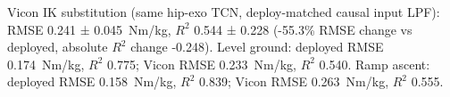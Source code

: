Vicon IK substitution (same hip-exo TCN, deploy-matched causal input LPF): RMSE 0.241 ± 0.045~Nm/kg, $R^2$ 0.544 ± 0.228
(-55.3\% RMSE change vs deployed, absolute $R^2$ change -0.248).
Level ground: deployed RMSE 0.174~Nm/kg, $R^2$ 0.775; Vicon RMSE 0.233~Nm/kg, $R^2$ 0.540.
Ramp ascent: deployed RMSE 0.158~Nm/kg, $R^2$ 0.839; Vicon RMSE 0.263~Nm/kg, $R^2$ 0.555.
